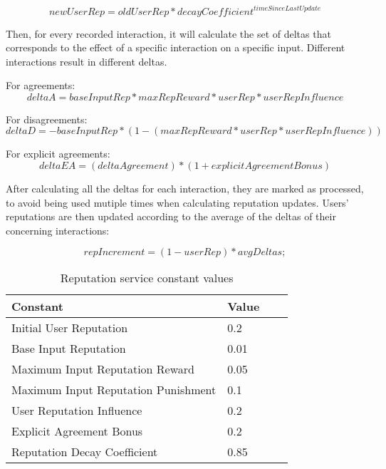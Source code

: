\begin{equation}
    newUserRep = oldUserRep * decayCoefficient^{timeSinceLastUpdate}
\end{equation}

Then, for every recorded interaction, it will calculate the set of deltas that corresponds to the effect of a specific interaction on a specific input. Different interactions result in different deltas.

For agreements:
\begin{equation}
    deltaA = baseInputRep * maxRepReward * userRep * userRepInfluence
\end{equation}

For disagreements:
\begin{equation}
    deltaD = -baseInputRep * (1 - (maxRepReward * userRep * userRepInfluence))
\end{equation}

For explicit agreements:
\begin{equation}
    deltaEA = (deltaAgreement) * (1 + explicitAgreementBonus)
\end{equation}

After calculating all the deltas for each interaction, they are marked as processed, to avoid being used mutiple times when calculating reputation updates. Users' reputations are then updated according to the average of the deltas of their concerning interactions:

\begin{equation}
    repIncrement = (1 - userRep) * avgDeltas;
\end{equation}

\begin{table}[h]
    \centering
    \caption{Reputation service constant values}
    \begin{tabular}{|l|l|l|l|}
        \hline
        \textbf{Constant}                   & \textbf{Value} \\ \hline
        Initial User Reputation             & 0.2 \\ \hline
        Base Input Reputation               & 0.01    \\ \hline
        Maximum Input Reputation Reward     & 0.05    \\ \hline
        Maximum Input Reputation Punishment & 0.1    \\ \hline
        User Reputation Influence           & 0.2    \\ \hline
        Explicit Agreement Bonus            & 0.2    \\ \hline
        Reputation Decay Coefficient        & 0.85    \\ \hline
    \end{tabular}
    \label{table:reputation-constants}
\end{table}

